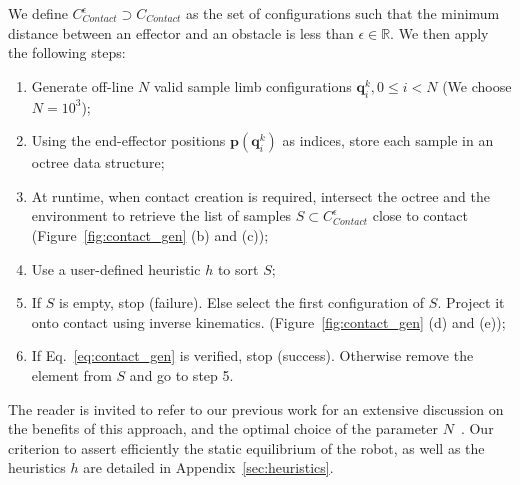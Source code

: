 We define $C_{Contact}^{\epsilon} \supset C_{Contact}$ as the set of configurations such that the minimum distance 
between an effector and an obstacle is less than $\epsilon \in \mathbb{R}$.
We then apply the following steps:
\begin{enumerate}
\item Generate off-line $N$ valid sample limb configurations $\mathbf{q}^k_i,  0 \leq i < N$ (We choose $N=10^3$);
\item Using the end-effector positions $\mathbf{p}(\mathbf{q}^k_i)$ as indices, store each sample in an octree data structure;
\item At runtime, when contact creation is required, intersect the octree and the environment to retrieve the list of samples $S \subset C_{Contact}^{\epsilon}$ close to contact (Figure~\ref{fig:contact_gen} (b) and (c));
\item Use a user-defined heuristic $h$ to sort $S$;
\item If $S$ is empty, stop (failure). Else select the first configuration of $S$. Project it onto contact using inverse kinematics. (Figure~\ref{fig:contact_gen} (d) and (e));
\item If Eq.~\ref{eq:contact_gen} is verified, stop (success). Otherwise remove the element from $S$ and go to step 5.
\end{enumerate}

The reader is invited to refer to our previous work for an extensive discussion on the benefits of this approach, and the optimal choice 
of the parameter $N$~\citep{Tonneau2014}. Our criterion to assert efficiently the static equilibrium of the robot, as well as the heuristics $h$ are detailed in Appendix~\ref{sec:heuristics}.


